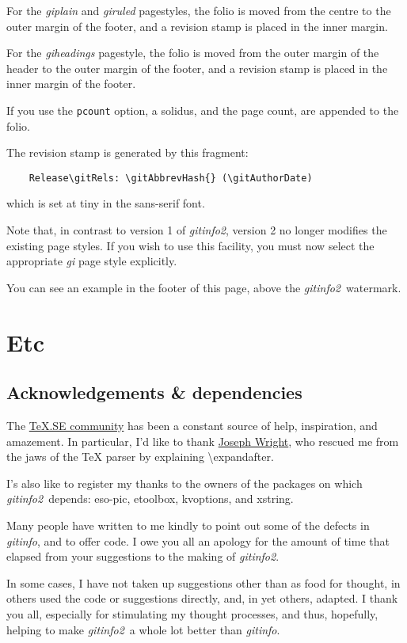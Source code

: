 \documentclass[draft,a4paper,12pt,twoside,openany]{memoir}
\newcommand{\sfit}[1]{\textit{#1}}
\newcommand{\opname}{\sfit{gitinfo}}
\newcommand{\tpname}{\sfit{gitinfo2}}
\begin{document}
For the \sfit{giplain} and \sfit{giruled} pagestyles,
the folio is moved from the centre to the outer margin of the footer,
and a revision stamp is placed in the inner margin.

For the \sfit{giheadings} pagestyle,
the folio is moved from the outer margin of the header
to the outer margin of the footer,
and a revision stamp is placed in the inner margin of the footer.

If you use the \texttt{pcount} option, a solidus, and the page count,
are appended to the folio.

The revision stamp is generated by this fragment:

\begin{verbatim}
    Release\gitRels: \gitAbbrevHash{} (\gitAuthorDate)
\end{verbatim}
\noindent
which is set at tiny in the sans-serif font.

Note that, in contrast to version 1 of \tpname,
version 2 no longer modifies the existing page styles.
If you wish to use this facility,
you must now select
the appropriate \sfit{gi\textellipsis} page style 
explicitly.

You can see an example in the footer of this page, 
above the \tpname\ watermark.
\chapter{Etc}
\section{Acknowledgements \& dependencies}

The \href{http://tex.stackexchange.com}{\TeX.SE community}
has been a constant source of help, inspiration, and amazement.
In particular, I'd like to thank
\href{http://tex.stackexchange.com/users/73/joseph-wright}{Joseph Wright},
who rescued me from the jaws of the TeX parser by explaining
\textbackslash expandafter.

I's also like to register my thanks to the owners of the packages on which
\tpname\ depends: eso-pic, etoolbox, kvoptions, and xstring.

Many people have written to me kindly
to point out some of the defects in \opname, and to offer code.
I owe you all an apology for the amount of time that elapsed
from your suggestions to the making of \tpname.

In some cases, I have not taken up suggestions other than as food for thought,
in others used the code or suggestions directly, and,
in yet others, adapted.
I thank you all, especially for stimulating my thought processes,
and thus, hopefully, 
helping to make \tpname\ a whole lot better than \opname.
\end{document}
